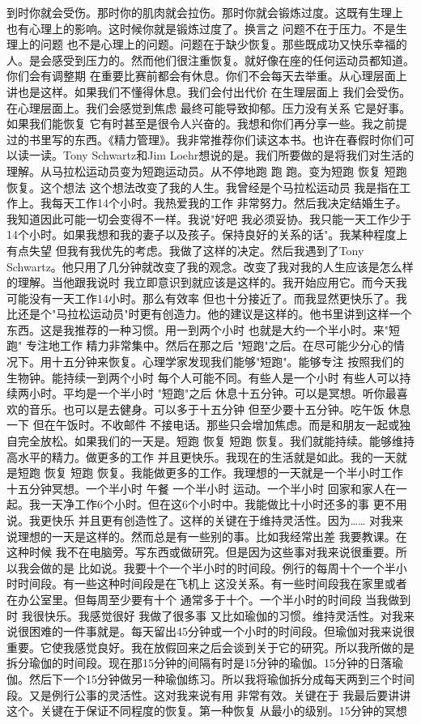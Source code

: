到时你就会受伤。那时你的肌肉就会拉伤。那时你就会锻炼过度。这既有生理上 也有心理上的影响。这时候你就是锻炼过度了。换言之 问题不在于压力。不是生理上的问题 也不是心理上的问题。问题在于缺少恢复。那些既成功又快乐幸福的人。是会感受到压力的。然而他们很注重恢复。就好像在座的任何运动员都知道。你们会有调整期 在重要比赛前都会有休息。你们不会每天去举重。从心理层面上讲也是这样。如果我们不懂得休息。我们会付出代价 在生理层面上 我们会受伤。在心理层面上。我们会感觉到焦虑 最终可能导致抑郁。压力没有关系 它是好事。如果我们能恢复 它有时甚至是很令人兴奋的。我想和你们再分享一些。我之前提过的书里写的东西。《精力管理》。我非常推荐你们读这本书。也许在春假时你们可以读一读。Tony Schwartz和Jim Loehr想说的是。我们所要做的是将我们对生活的理解。从马拉松运动员变为短跑运动员。从不停地跑 跑 跑。变为短跑 恢复 短跑 恢复。这个想法 这个想法改变了我的人生。我曾经是个马拉松运动员 我是指在工作上。我每天工作14个小时。我热爱我的工作 非常努力。然后我决定结婚生子。我知道因此可能一切会变得不一样。我说"好吧 我必须妥协。我只能一天工作少于14个小时。如果我想和我的妻子以及孩子。保持良好的关系的话"。我某种程度上有点失望 但我有我优先的考虑。我做了这样的决定。然后我遇到了Tony Schwartz。他只用了几分钟就改变了我的观念。改变了我对我的人生应该是怎么样的理解。当他跟我说时 我立即意识到就应该是这样的。我开始应用它。而今天我可能没有一天工作14小时。那么有效率 但也十分接近了。而我显然更快乐了。我比还是个"马拉松运动员"时更有创造力。他的建议是这样的。他书里讲到这样一个东西。这是我推荐的一种习惯。用一到两个小时 也就是大约一个半小时。来"短跑" 专注地工作 精力非常集中。然后在那之后 "短跑"之后。在尽可能少分心的情况下。用十五分钟来恢复。心理学家发现我们能够"短跑"。能够专注 按照我们的生物钟。能持续一到两个小时 每个人可能不同。有些人是一个小时 有些人可以持续两小时。平均是一个半小时 "短跑"之后 休息十五分钟。可以是冥想。听你最喜欢的音乐。也可以是去健身。可以多于十五分钟 但至少要十五分钟。吃午饭 休息一下 但在午饭时。不收邮件 不接电话。那些只会增加焦虑。而是和朋友一起或独自完全放松。如果我们的一天是。短跑 恢复 短跑 恢复。我们就能持续。能够维持高水平的精力。做更多的工作 并且更快乐。我现在的生活就是如此。我的一天就是短跑 恢复 短跑 恢复。我能做更多的工作。我理想的一天就是一个半小时工作 十五分钟冥想。一个半小时 午餐 一个半小时 运动。一个半小时 回家和家人在一起。我一天净工作6个小时。但在这6个小时中。我能做比十小时还多的事 更不用说。我更快乐 并且更有创造性了。这样的关键在于维持灵活性。因为…… 对我来说理想的一天是这样的。然而总是有一些别的事。比如我经常出差 我要教课。在这种时候 我不在电脑旁。写东西或做研究。但是因为这些事对我来说很重要。所以我会做的是 比如说。我要十个一个半小时的时间段。例行的每周十个一个半小时时间段。有一些这种时间段是在飞机上 这没关系。有一些时间段我在家里或者在办公室里。但每周至少要有十个 通常多于十个。一个半小时的时间段 当我做到时 我很快乐。我感觉很好 我做了很多事 又比如瑜伽的习惯。维持灵活性。对我来说很困难的一件事就是。每天留出45分钟或一个小时的时间段。但瑜伽对我来说很重要。它使我感觉良好。我在放假回来之后会谈到关于它的研究。所以我所做的是 拆分瑜伽的时间段。现在那15分钟的间隔有时是15分钟的瑜伽。15分钟的日落瑜伽。然后下一个15分钟做另一种瑜伽练习。所以我将瑜伽拆分成每天两到三个时间段。又是例行公事的灵活性。这对我来说有用 非常有效。关键在于 我最后要讲讲这个。关键在于保证不同程度的恢复。第一种恢复 从最小的级别。15分钟的冥想 